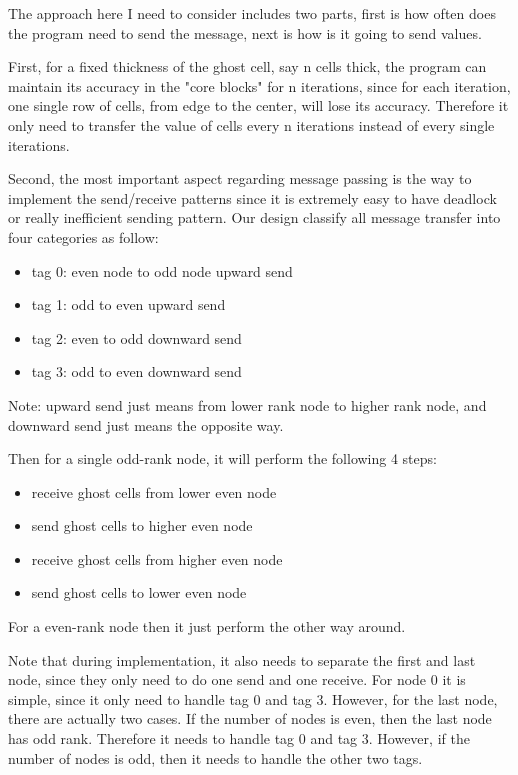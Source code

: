 \documentclass{cs4444}
\begin{document}
			The approach here I need to consider includes two parts, first is how often does the program need to send the message, next is how is it going to send values.

			First, for a fixed thickness of the ghost cell, say n cells thick, the program can maintain its accuracy in the "core blocks" for n iterations, since for each iteration, one single row of cells, from edge to the center, will lose its accuracy. Therefore it only need to transfer the value of cells every n iterations instead of every single iterations. 
			
			Second, the most important aspect regarding message passing is the way to implement the send/receive patterns since it is extremely easy to have deadlock or really inefficient sending pattern. Our design classify all message transfer into four categories as follow:
	\begin{itemize}			
	\item tag 0: even node to odd node upward send
	\item tag 1: odd to even upward send
	\item tag 2: even to odd downward send
	\item tag 3: odd to even downward send
	\end{itemize}
	Note: upward send just means from lower rank node to higher rank node, and downward send just means the opposite way.
	
	Then for a single odd-rank node, it will perform the following 4 steps:
				\begin{itemize}			
	\item receive ghost cells from lower even node
	\item send ghost cells to higher even node 
	\item receive ghost cells from higher even node
	\item send ghost cells to lower even node
		\end{itemize}
	
	For a even-rank node then it just perform the other way around.
	
	Note that during implementation, it also needs to separate the first and last node, since they only need to do one send and one receive. For node 0 it is simple, since it only need to handle tag 0 and tag 3. However, for the last node, there are actually two cases. If the number of nodes is even, then the last node has odd rank. Therefore it needs to handle tag 0 and tag 3. However, if the number of nodes is odd, then it needs to handle the other two tags. 
	
\end{document}
